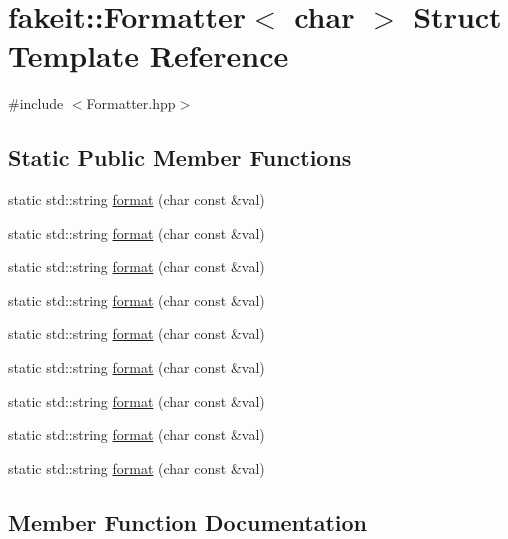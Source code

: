 \hypertarget{structfakeit_1_1Formatter_3_01char_01_4}{}\section{fakeit\+::Formatter$<$ char $>$ Struct Template Reference}
\label{structfakeit_1_1Formatter_3_01char_01_4}


{\ttfamily \#include $<$Formatter.\+hpp$>$}

\subsection*{Static Public Member Functions}
\begin{DoxyCompactItemize}
\item 
static std\+::string \mbox{\hyperlink{structfakeit_1_1Formatter_3_01char_01_4_af27afa068787a34b29ea545907c3daaf}{format}} (char const \&val)
\item 
static std\+::string \mbox{\hyperlink{structfakeit_1_1Formatter_3_01char_01_4_af27afa068787a34b29ea545907c3daaf}{format}} (char const \&val)
\item 
static std\+::string \mbox{\hyperlink{structfakeit_1_1Formatter_3_01char_01_4_af27afa068787a34b29ea545907c3daaf}{format}} (char const \&val)
\item 
static std\+::string \mbox{\hyperlink{structfakeit_1_1Formatter_3_01char_01_4_af27afa068787a34b29ea545907c3daaf}{format}} (char const \&val)
\item 
static std\+::string \mbox{\hyperlink{structfakeit_1_1Formatter_3_01char_01_4_af27afa068787a34b29ea545907c3daaf}{format}} (char const \&val)
\item 
static std\+::string \mbox{\hyperlink{structfakeit_1_1Formatter_3_01char_01_4_af27afa068787a34b29ea545907c3daaf}{format}} (char const \&val)
\item 
static std\+::string \mbox{\hyperlink{structfakeit_1_1Formatter_3_01char_01_4_af27afa068787a34b29ea545907c3daaf}{format}} (char const \&val)
\item 
static std\+::string \mbox{\hyperlink{structfakeit_1_1Formatter_3_01char_01_4_af27afa068787a34b29ea545907c3daaf}{format}} (char const \&val)
\item 
static std\+::string \mbox{\hyperlink{structfakeit_1_1Formatter_3_01char_01_4_af27afa068787a34b29ea545907c3daaf}{format}} (char const \&val)
\end{DoxyCompactItemize}


\subsection{Member Function Documentation}
\mbox{\label{structfakeit_1_1Formatter_3_01char_01_4_af27afa068787a34b29ea545907c3daaf}} 
